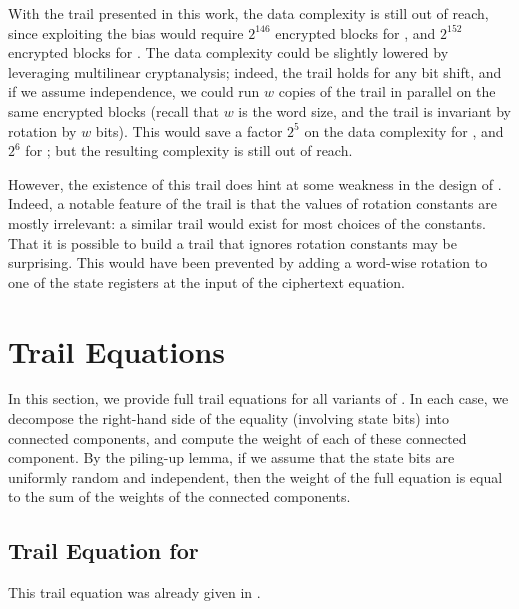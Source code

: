 \documentclass{llncs}
\begin{document}
With the trail presented in this work, the data complexity is still out of reach, since exploiting the bias would require $2^{146}$ encrypted blocks for , and $2^{152}$ encrypted blocks for . The data complexity could be slightly lowered by leveraging multilinear cryptanalysis; indeed, the trail holds for any bit shift, and if we assume independence, we could run $w$ copies of the trail in parallel on the same encrypted blocks (recall that $w$ is the word size, and the trail is invariant by rotation by $w$ bits). This would save a factor $2^5$ on the data complexity for , and $2^6$ for ; but the resulting complexity is still out of reach.

However, the existence of this trail does hint at some weakness in the design of . Indeed, a notable feature of the trail is that the values of rotation constants are mostly irrelevant: a similar trail would exist for most choices of the constants. That it is possible to build a trail that ignores rotation constants may be surprising. This would have been prevented by adding a word-wise rotation to one of the state registers at the input of the ciphertext equation.

\appendix

\section{Trail Equations}
\label{sec:traileq}

In this section, we provide full trail equations for all variants of . In each case, we decompose the right-hand side of the equality (involving state bits) into connected components, and compute the weight of each of these connected component. By the piling-up lemma, if we assume that the state bits are uniformly random and independent, then the weight of the full equation is equal to the sum of the weights of the connected components.

\subsection{Trail Equation for }

This trail equation was already given in .
\end{document}
